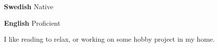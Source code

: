 \documentclass[9pt]{developercv} %
\begin{document}

\begin{minipage}[t]{0.3\textwidth}
	\vspace{-\baselineskip} %


	\textbf{Swedish} Native

	\textbf{English} Proficient
\end{minipage}
\hfill
\begin{minipage}[t]{0.3\textwidth}
	\vspace{-\baselineskip} %
	

 I like reading to relax, or working on some hobby project in my home.
\end{minipage}
\hfill

\end{document}
